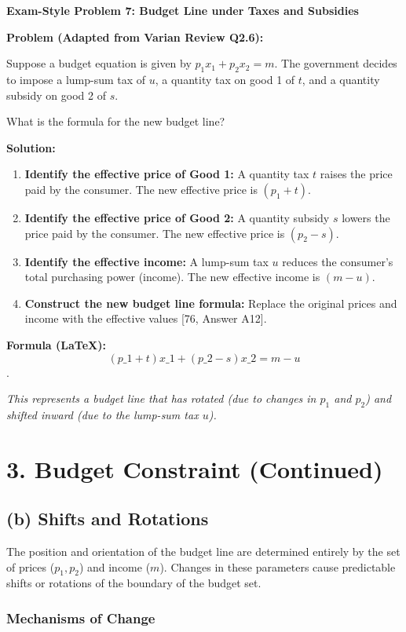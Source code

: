 \documentclass{article}
\begin{document}
\textbf{Exam-Style Problem 7: Budget Line under Taxes and Subsidies}

\textbf{Problem (Adapted from Varian Review Q2.6):}

Suppose a budget equation is given by $p_1x_1 + p_2x_2 = m$. The government decides to impose a lump-sum tax of $u$, a quantity tax on good 1 of $t$, and a quantity subsidy on good 2 of $s$.

What is the formula for the new budget line?

\textbf{Solution:}

\begin{enumerate}
    \item \textbf{Identify the effective price of Good 1:} A quantity tax $t$ raises the price paid by the consumer. The new effective price is $(p_1 + t)$.
    \item \textbf{Identify the effective price of Good 2:} A quantity subsidy $s$ lowers the price paid by the consumer. The new effective price is $(p_2 - s)$.
    \item \textbf{Identify the effective income:} A lump-sum tax $u$ reduces the consumer's total purchasing power (income). The new effective income is $(m - u)$.
    \item \textbf{Construct the new budget line formula:} Replace the original prices and income with the effective values [76, Answer A12].
\end{enumerate}

\textbf{Formula (LaTeX):} $$(p\_1 + t)x\_1 + (p\_2 - s)x\_2 = m - u$$.

\textit{This represents a budget line that has rotated (due to changes in $p_1$ and $p_2$) and shifted inward (due to the lump-sum tax $u$).}

\section*{3. Budget Constraint (Continued)}
\subsection*{(b) Shifts and Rotations}

The position and orientation of the budget line are determined entirely by the set of prices ($p_1, p_2$) and income ($m$). Changes in these parameters cause predictable shifts or rotations of the boundary of the budget set.

\subsubsection*{Mechanisms of Change}
\end{document}
